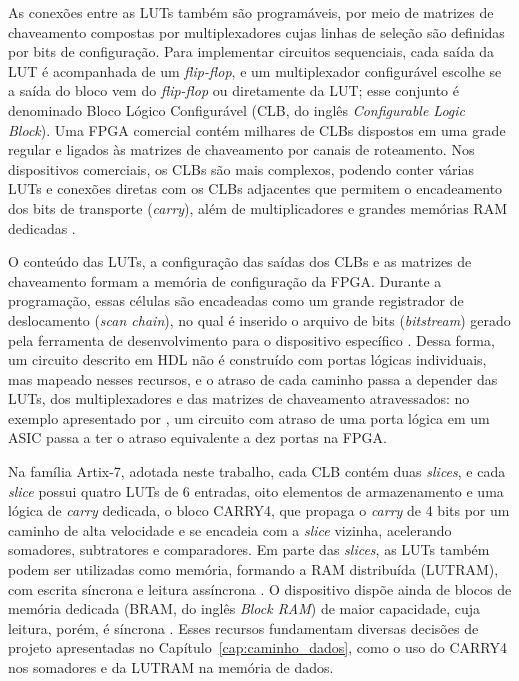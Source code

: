 As conexões entre as LUTs também são programáveis, por meio de matrizes de chaveamento compostas por multiplexadores cujas linhas de seleção são definidas por bits de configuração. Para implementar circuitos sequenciais, cada saída da LUT é acompanhada de um \textit{flip-flop}, e um multiplexador configurável escolhe se a saída do bloco vem do \textit{flip-flop} ou diretamente da LUT; esse conjunto é denominado Bloco Lógico Configurável (CLB, do inglês \textit{Configurable Logic Block}). Uma FPGA comercial contém milhares de CLBs dispostos em uma grade regular e ligados às matrizes de chaveamento por canais de roteamento. Nos dispositivos comerciais, os CLBs são mais complexos, podendo conter várias LUTs e conexões diretas com os CLBs adjacentes que permitem o encadeamento dos bits de transporte (\textit{carry}), além de multiplicadores e grandes memórias RAM dedicadas \cite{vahid2008sistemas}.

O conteúdo das LUTs, a configuração das saídas dos CLBs e as matrizes de chaveamento formam a memória de configuração da FPGA. Durante a programação, essas células são encadeadas como um grande registrador de deslocamento (\textit{scan chain}), no qual é inserido o arquivo de bits (\textit{bitstream}) gerado pela ferramenta de desenvolvimento para o dispositivo específico \cite{vahid2008sistemas}. Dessa forma, um circuito descrito em HDL não é construído com portas lógicas individuais, mas mapeado nesses recursos, e o atraso de cada caminho passa a depender das LUTs, dos multiplexadores e das matrizes de chaveamento atravessados: no exemplo apresentado por , um circuito com atraso de uma porta lógica em um ASIC passa a ter o atraso equivalente a dez portas na FPGA.

Na família Artix-7, adotada neste trabalho, cada CLB contém duas \textit{slices}, e cada \textit{slice} possui quatro LUTs de 6 entradas, oito elementos de armazenamento e uma lógica de \textit{carry} dedicada, o bloco CARRY4, que propaga o \textit{carry} de 4 bits por um caminho de alta velocidade e se encadeia com a \textit{slice} vizinha, acelerando somadores, subtratores e comparadores. Em parte das \textit{slices}, as LUTs também podem ser utilizadas como memória, formando a RAM distribuída (LUTRAM), com escrita síncrona e leitura assíncrona \cite{ug474}. O dispositivo dispõe ainda de blocos de memória dedicada (BRAM, do inglês \textit{Block RAM}) de maior capacidade, cuja leitura, porém, é síncrona \cite{ug473}. Esses recursos fundamentam diversas decisões de projeto apresentadas no Capítulo~\ref{cap:caminho_dados}, como o uso do CARRY4 nos somadores e da LUTRAM na memória de dados.

